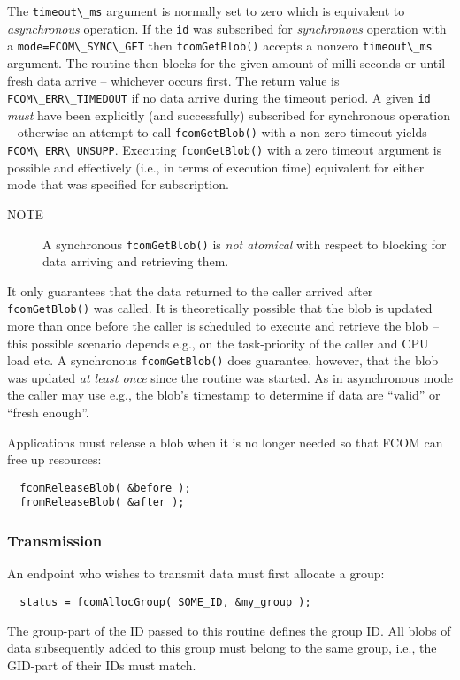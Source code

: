 \documentclass[11pt]{article}
\newcommand{\fcom}{FCOM}
\newcommand{\blob}{blob}
\newcommand{\group}{group}
\newcommand{\cstl}[1]{{\lstinline+#1+}}
\newcommand{\note}[1]{
	\begin{description}
		\item[NOTE] #1
	\end{description}
}
\begin{document}
      The \cstl{timeout\_ms} argument is normally set to
      zero which is equivalent to {\em asynchronous} operation.
      If the \cstl{id} was subscribed for {\em synchronous}
      operation with a \cstl{mode=FCOM\_SYNC\_GET} then
      \cstl{fcomGetBlob()} accepts a nonzero \cstl{timeout\_ms}
      argument. The routine then blocks for the given amount
      of milli-seconds or until fresh data arrive -- whichever
      occurs first. The return value is \cstl{FCOM\_ERR\_TIMEDOUT}
      if no data arrive during the timeout period.
      A given \cstl{id} {\em must} have been explicitly (and
      successfully) subscribed for synchronous operation --
      otherwise an attempt to call \cstl{fcomGetBlob()} with
      a non-zero timeout yields \cstl{FCOM\_ERR\_UNSUPP}.
      Executing \cstl{fcomGetBlob()} with a zero timeout 
      argument is possible and effectively (i.e., in terms
      of execution time) equivalent for either mode that
      was specified for subscription.
      \note{A synchronous \cstl{fcomGetBlob()} is {\em
      not atomical} with respect to blocking for data arriving
      and retrieving them.}
      It only guarantees that the data
      returned to the caller arrived after \cstl{fcomGetBlob()}
      was called. It is theoretically possible that the blob
      is updated more than once before the caller is scheduled
      to execute and retrieve the blob -- this possible scenario
      depends e.g., on the task-priority of the caller and CPU
      load etc. A synchronous \cstl{fcomGetBlob()} does guarantee,
      however, that the blob was updated {\em at least once}
      since the routine was started. As in asynchronous mode
      the caller may use e.g., the blob's timestamp to determine
      if data are ``valid'' or ``fresh enough''.

      Applications must release a \blob{} when it
      is no longer needed so that \fcom{} can free
      up resources:

      \begin{verbatim}
  fcomReleaseBlob( &before );
  fromReleaseBlob( &after );
      \end{verbatim}
    \subsubsection{Transmission}
      An endpoint who wishes to transmit data must first
      allocate a group:
      \begin{verbatim}
  status = fcomAllocGroup( SOME_ID, &my_group );
      \end{verbatim}
      The group-part of the ID passed to this routine
      defines the group ID. All \blob{}s of data subsequently
      added to this \group{} must belong to the same \group{},
      i.e., the GID-part of their IDs must match.
\end{document}
